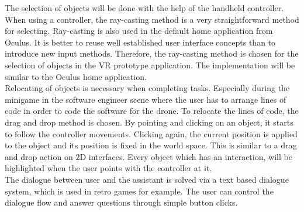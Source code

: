 The selection of objects will be done with the help of the handheld controller. When using a controller, the ray-casting method is a very straightforward method for selecting. Ray-casting is also used in the default home application from Oculus. It is better to reuse well established user interface concepts than to introduce new input methods. Therefore, the ray-casting method is chosen for the selection of objects in the VR prototype application. The implementation will be similar to the Oculus home application.\\
Relocating of objects is necessary when completing tasks. Especially during the minigame in the software engineer scene where the user has to arrange lines of code in order to code the software for the drone. To relocate the lines of code, the drag and drop method is chosen. By pointing and clicking on an object, it starts to follow the controller movements. Clicking again, the current position is applied to the object and its position is fixed in the world space. This is similar to a drag and drop action on 2D interfaces. Every object which has an interaction, will be highlighted when the user points with the controller at it.\\
The dialogue between user and the assistant is solved via a text based dialogue system, which is used in retro games for example. The user can control the dialogue flow and answer questions through simple button clicks.
